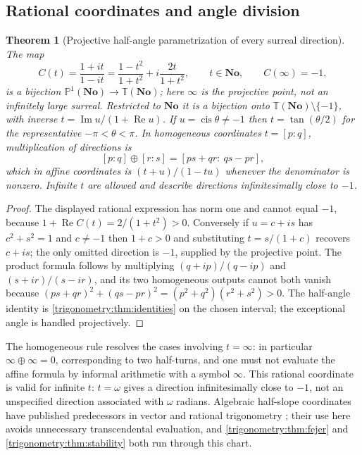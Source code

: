 \documentclass[11pt,letterpaper]{article}
\numberwithin{equation}{section}
\newtheorem{theorem}{Theorem}[section]
\theoremstyle{definition}
\theoremstyle{remark}
\newcommand{\No}{\mathbf{No}}
\newcommand{\TT}{\mathbb T}
\newcommand{\PP}{\mathbb P}
\newcommand{\re}{\operatorname{Re}}
\newcommand{\im}{\operatorname{Im}}
\newcommand{\cis}{\operatorname{cis}}
\begin{document}
\subsection{Rational coordinates and angle division}
\begin{theorem}[Projective half-angle parametrization of every surreal direction]
\label{trigonometry:thm:cayley}
The map
\begin{equation}\label{trigonometry:eq:cayley}
 C(t)=\frac{1+it}{1-it}=\frac{1-t^2}{1+t^2}+i\frac{2t}{1+t^2},\qquad t\in\No,
 \qquad C(\infty)=-1,
\end{equation}
is a bijection $\PP^1(\No)\to\TT(\No)$; here $\infty$ is the projective point, not an infinitely
large surreal. Restricted to $\No$ it is a bijection onto $\TT(\No)\setminus\{-1\}$, with inverse
$t=\im u/(1+\re u)$. If $u=\cis\theta\ne-1$ then $t=\tan(\theta/2)$ for the representative
$-\pi<\theta<\pi$. In homogeneous coordinates $t=[p:q]$, multiplication of directions is
\begin{equation}\label{trigonometry:eq:projectiveaddition}
 [p:q]\oplus[r:s]=[ps+qr:\ qs-pr],
\end{equation}
which in affine coordinates is $(t+u)/(1-tu)$ whenever the denominator is nonzero. Infinite $t$
are allowed and describe directions infinitesimally close to $-1$.
\end{theorem}
\begin{proof}
The displayed rational expression has norm one and cannot equal $-1$, because
$1+\re C(t)=2/(1+t^2)>0$. Conversely if $u=c+is$ has $c^2+s^2=1$ and $c\ne-1$ then $1+c>0$ and
substituting $t=s/(1+c)$ recovers $c+is$; the only omitted direction is $-1$, supplied by the
projective point. The product formula follows by multiplying $(q+ip)/(q-ip)$ and $(s+ir)/(s-ir)$,
and its two homogeneous outputs cannot both vanish because
$(ps+qr)^2+(qs-pr)^2=(p^2+q^2)(r^2+s^2)>0$. The half-angle identity is
\cref{trigonometry:thm:identities} on the chosen interval; the exceptional angle is handled
projectively.
\end{proof}
The homogeneous rule resolves the cases involving $t=\infty$: in particular
$\infty\oplus\infty=0$, corresponding to two half-turns, and one must not evaluate the affine
formula by informal arithmetic with a symbol $\infty$. This rational coordinate is valid for
infinite $t$: $t=\omega$ gives a direction infinitesimally close to $-1$, not an unspecified
direction associated with $\omega$ radians. Algebraic half-slope coordinates have published
predecessors in vector and rational trigonometry \cite{Wildberger,Gunn}; their use here avoids
unnecessary transcendental evaluation, and \cref{trigonometry:thm:fejer} and
\cref{trigonometry:thm:stability} both run through this chart.
\end{document}
